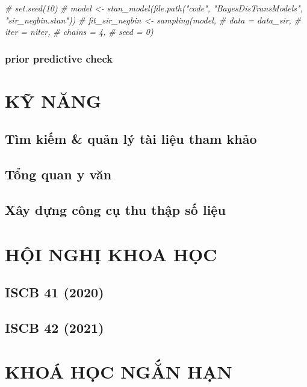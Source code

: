 \documentclass[
]{book}
\newenvironment{Shaded}{\begin{snugshade}}{\end{snugshade}}
\newcommand{\CommentTok}[1]{\textcolor[rgb]{0.56,0.35,0.01}{\textit{#1}}}
\begin{document}
\begin{Shaded}
\begin{Highlighting}[]
\CommentTok{\# set.seed(10)}
\CommentTok{\# model \textless{}{-} stan\_model(file.path("code", "BayesDisTransModels", "sir\_negbin.stan"))}
\CommentTok{\# fit\_sir\_negbin \textless{}{-} sampling(model,}
\CommentTok{\#                 data = data\_sir,}
\CommentTok{\#                 iter = niter,}
\CommentTok{\#                 chains = 4, }
\CommentTok{\#                 seed = 0)}
\end{Highlighting}
\end{Shaded}

\hypertarget{prior-predictive-check}{%
\section{prior predictive check}\label{prior-predictive-check}}

\hypertarget{part-kux1ef9-nux103ng}{%
\part{KỸ NĂNG}\label{part-kux1ef9-nux103ng}}

\hypertarget{kn_tltk}{%
\chapter{Tìm kiếm \& quản lý tài liệu tham khảo}\label{kn_tltk}}

\hypertarget{kn_tqyv}{%
\chapter{Tổng quan y văn}\label{kn_tqyv}}

\hypertarget{kn_ccttsl}{%
\chapter{Xây dựng công cụ thu thập số liệu}\label{kn_ccttsl}}

\hypertarget{part-hux1ed9i-nghux1ecb-khoa-hux1ecdc}{%
\part{HỘI NGHỊ KHOA HỌC}\label{part-hux1ed9i-nghux1ecb-khoa-hux1ecdc}}

\hypertarget{hn_iscb41}{%
\chapter{ISCB 41 (2020)}\label{hn_iscb41}}

\hypertarget{hn_iscb42}{%
\chapter{ISCB 42 (2021)}\label{hn_iscb42}}

\hypertarget{part-khouxe1-hux1ecdc-ngux1eafn-hux1ea1n}{%
\part{KHOÁ HỌC NGẮN HẠN}\label{part-khouxe1-hux1ecdc-ngux1eafn-hux1ea1n}}

  
\end{document}
